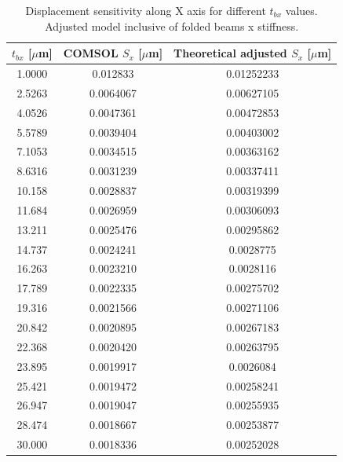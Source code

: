 \documentclass[lettersize,journal]{IEEEtran}
\begin{document}
     \begin{table}[!h]
        \caption{Displacement sensitivity along X axis for different \(t_{bx}\) values. Adjusted model inclusive of folded beams x stiffness.}
        \renewcommand{\arraystretch}{1.2}
        \centering
        \begin{tabular}{|c|c|c|}
            \hline
            \textbf{\(t_{bx}\) [\(\mu\)m]} & \textbf{COMSOL \(S_x\) [\(\mu\)m]} & \textbf{Theoretical adjusted \(S_x\) [\(\mu\)m]}\\ \hline
            1.0000       & 0.012833      & 0.01252233                 \\ \hline
            2.5263       & 0.0064067     & 0.00627105                 \\ \hline
            4.0526       & 0.0047361     & 0.00472853                \\ \hline
            5.5789       & 0.0039404     & 0.00403002                 \\ \hline
            7.1053       & 0.0034515     & 0.00363162                 \\ \hline
            8.6316       & 0.0031239     & 0.00337411               \\ \hline
            10.158       & 0.0028837     & 0.00319399                 \\ \hline
            11.684       & 0.0026959     & 0.00306093                 \\ \hline
            13.211       & 0.0025476     & 0.00295862                 \\ \hline
            14.737       & 0.0024241     & 0.0028775                  \\ \hline
            16.263       & 0.0023210     & 0.0028116                  \\ \hline
            17.789       & 0.0022335     & 0.00275702               \\ \hline
            19.316       & 0.0021566     & 0.00271106                 \\ \hline
            20.842       & 0.0020895     & 0.00267183                 \\ \hline
            22.368       & 0.0020420     & 0.00263795                \\ \hline
            23.895       & 0.0019917     & 0.0026084                 \\ \hline
            25.421       & 0.0019472     & 0.00258241                \\ \hline
            26.947       & 0.0019047     & 0.00255935               \\ \hline
            28.474       & 0.0018667     & 0.00253877                \\ \hline
            30.000       & 0.0018336     & 0.00252028               \\ \hline
        \end{tabular}
        \label{tab:tbx_sweep_adj}
    \end{table}
    
\end{document}

